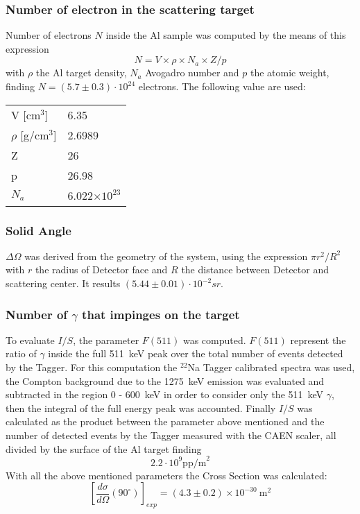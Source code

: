  \subsubsection*{Number of electron in the scattering target}
 Number of electrons $N$ inside the Al sample was computed by the means of this expression 
\[
N=V\times \rho\times N_a\times Z/p
\]
with $\rho$ the Al target density, $N_a$ Avogadro number and $p$  the atomic weight, finding $N=(5.7 \pm 0.3)\cdot10^{24}$ electrons. The following value are used:
\begin{table}[H]
\centering
\begin{tabular}{ll}
\toprule
\toprule
V [cm$^3$] & 6.35 \\
$\rho$ [g/cm$^3$] & 2.6989\\
Z & 26 \\
p & 26.98 \\
$N_a$ & 6.022$\times 10^{23}$ \\
\bottomrule
\bottomrule
\end{tabular}
\end{table}
 
\subsubsection*{Solid Angle }
$\Delta\Omega$ was derived from the geometry of the system, using the expression $\pi r^2/R^2$ with $r$ the radius of Detector face and $R$ the distance between Detector and scattering center. It results $(5.44\pm0.01)\cdot 10^{-2} sr$. 
  
\subsubsection*{Number of $\gamma$ that impinges on the target}
To evaluate $I/S$, the parameter $F(511)$ was computed. $F(511)$ represent the ratio of $\gamma$ inside the full 511~keV peak over the total number of events detected by the Tagger. For this computation the $^{22}$Na Tagger calibrated spectra was used, the Compton background due to the 1275~keV emission was evaluated and subtracted in the region 0 - 600~keV in order to consider only the 511~keV $\gamma$, then the integral of the full energy peak was accounted.
Finally $I/S$ was calculated as the product between the parameter above mentioned and the number of detected events by the Tagger measured with the CAEN scaler, all divided by the surface of the Al target finding 
\[2.2\cdot10^{9} \text{pp/m}^2\]
With all the above mentioned parameters the Cross Section was calculated:
  \begin{equation*}
  	\left[\frac{d\sigma}{d\Omega}(90^{\circ})\right]_{exp}=(4.3\pm0.2) \times 10^{-30}\ \text{m}^{2}
  \end{equation*}
  
  
 
